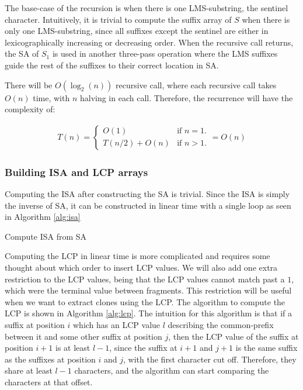 The base-case of the recursion is when there is one LMS-substring, the sentinel
character. Intuitively, it is trivial to compute the suffix array of $S$ when there is
only one LMS-substring, since all suffixes except the sentinel are either in
lexicographically increasing or decreasing order. When the recursive call returns, the SA
of $S_1$ is used in another three-pass operation where the LMS suffixes guide the rest of
the suffixes to their correct location in SA.

There will be $O(\log_2(n))$ recursive call, where each recursive call takes $O(n)$ time,
with $n$ halving in each call. Therefore, the recurrence will have the complexity of:

\begin{gather*}
    T(n) =
\begin{cases}
    O(1) & \text{if } n = 1. \\
    T(n / 2) + O(n) & \text{if } n > 1.
\end{cases}
= O(n)
\end{gather*}

\subsubsection{Building ISA and LCP arrays}

Computing the ISA after constructing the SA is trivial. Since the ISA is simply the inverse
of SA, it can be constructed in linear time with a single loop as seen in Algorithm
\ref{alg:isa}

\begin{algorithm}[htp]
  \SetAlgoLined\DontPrintSemicolon

  \vspace{0.5cm}
  \caption{Compute ISA from SA}
  \label{alg:isa}
\end{algorithm}


Computing the LCP in linear time is more complicated and requires some thought about which
order to insert LCP values. We will also add one extra restriction to the LCP values,
being that the LCP values cannot match past a $1$, which were the terminal value between
fragments. This restriction will be useful when we want to extract clones using the LCP.
The algorithm to compute the LCP is shown in Algorithm \ref{alg:lcp}. The intuition for
this algorithm is that if a suffix at position $i$ which has an LCP value $l$ describing
the common-prefix between it and some other suffix at position $j$, then the LCP value of
the suffix at position $i + 1$ is at least $l - 1$, since the suffix at $i + 1$ and $j +
1$ is the same suffix as the suffixes at position $i$ and $j$, with the first character
cut off. Therefore, they share at least $l - 1$ characters, and the algorithm can start
comparing the characters at that offset.

